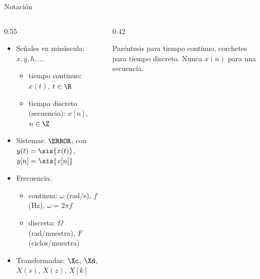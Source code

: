 \documentclass[aspectratio=169,11pt]{beamer}
\begin{document}
\begin{frame}{Notación}
  \begin{columns}[c]
    \begin{column}{0.55\textwidth}
      \begin{itemize}
        \item Señales en minúscula: $x, y, h, \ldots$
        \begin{itemize}
          \item tiempo continuo: $x(t)$, $t\in\R$
          \item tiempo discreto (secuencia): $x[n]$, $n\in\Z$
        \end{itemize}
        \item Sistemas: $\T$, con $y(t)=\sis{x(t)}$, $y[n]=\sis{x[n]}$
        \item Frecuencia:
        \begin{itemize}
          \item continua: $\omega$ (rad/s), $f$ (Hz), $\omega=2\pi f$
          \item discreta: $\Omega$ (rad/muestra), $F$ (ciclos/muestra)
        \end{itemize}
        \item Transformadas: $\Xc$, $\Xd$, $X(s)$, $X(z)$, $X[k]$
      \end{itemize}
    \end{column}
    \begin{column}{0.42\textwidth}
      \begin{importante}[Convenio]
        Paréntesis para tiempo continuo, corchetes para tiempo discreto. Nunca $x(n)$ para una secuencia.
      \end{importante}
      \begin{center}
      \end{center}
    \end{column}
  \end{columns}
\end{frame}
\end{document}
